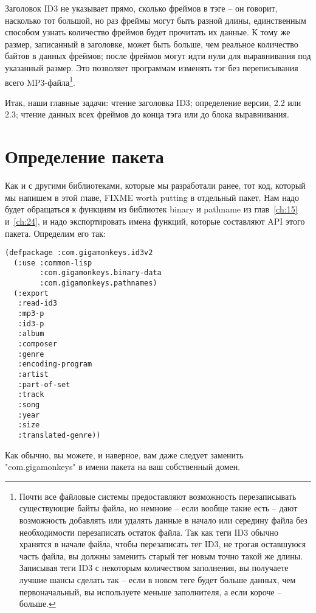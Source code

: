 Заголовок ID3 не указывает прямо, сколько фреймов в тэге -- он говорит, насколько тот
большой, но раз фреймы могут быть разной длины, единственным способом узнать количество
фреймов будет прочитать их данные.  К тому же размер, записанный в заголовке, может быть
больше, чем реальное количество байтов в данных фреймов; после фреймов могут идти нули для
выравнивания под указанный размер.  Это позволяет программам изменять тэг без
переписывания всего MP3-файла\footnote{Почти все файловые системы предоставляют
  возможность перезаписывать существующие байты файла, но немноие -- если вообще такие
  есть -- дают возможность добавлять или удалять данные в начало или середину файла без
  необходимости перезаписать остаток файла. Так как теги ID3 обычно хранятся в начале
  файла, чтобы перезаписать тег ID3, не трогая оставшуюся часть файла, вы должны заменить
  старый тег новым точно такой же длины. Записывая теги ID3 с некоторым количеством
  заполнения, вы получаете лучшие шансы сделать так -- если в новом теге будет больше
  данных, чем первоначальный, вы используете меньше заполнителя, а если короче --
  больше.}.

Итак, наши главные задачи: чтение заголовка ID3; определение версии, 2.2 или 2.3; чтение
данных всех фреймов до конца тэга или до блока выравнивания.

\section{Определение пакета}

Как и с другими библиотеками, которые мы разработали ранее, тот код, который мы напишем в
этой главе, FIXME worth putting в отдельный пакет.  Нам надо будет обращаться к функциям
из библиотек binary и pathname из глав~\ref{ch:15} и~\ref{ch:24}, и надо экспортировать
имена функций, которые составляют API этого пакета.  Определим его так:

\begin{lstlisting}
(defpackage :com.gigamonkeys.id3v2
  (:use :common-lisp
        :com.gigamonkeys.binary-data
        :com.gigamonkeys.pathnames)
  (:export
   :read-id3
   :mp3-p
   :id3-p
   :album
   :composer
   :genre
   :encoding-program
   :artist
   :part-of-set
   :track
   :song
   :year
   :size
   :translated-genre))
\end{lstlisting}

Как обычно, вы можете, и наверное, вам даже следует заменить "com.gigamonkeys" в имени
пакета на ваш собственный домен.

